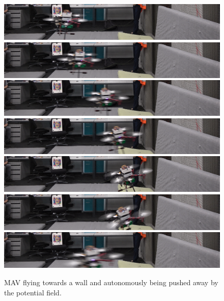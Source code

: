 \begin{figure}
	\centering
	\includegraphics[width=0.9\linewidth]{pictures/av1.png}
	\includegraphics[width=0.9\linewidth]{pictures/av2.png}
	\includegraphics[width=0.9\linewidth]{pictures/av3.png}
	\includegraphics[width=0.9\linewidth]{pictures/av4.png}
	\includegraphics[width=0.9\linewidth]{pictures/av5.png}
	\includegraphics[width=0.9\linewidth]{pictures/av6.png}
	\includegraphics[width=0.9\linewidth]{pictures/av7.png}	
	\caption{MAV flying towards a wall and autonomously being pushed away by the potential field.}
	\label{fig:maneuvre}
\end{figure}

